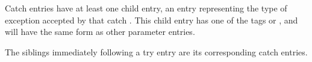 Catch  entries have at 
least one child entry, an
entry representing the type of exception accepted by
that catch . 
This child entry has one of 
the 
tags
\DWTAGformalparameter{} or
\DWTAGunspecifiedparameters,
and will have the same form as other parameter entries.

The siblings immediately following 
a try  entry are its
corresponding catch  entries.







